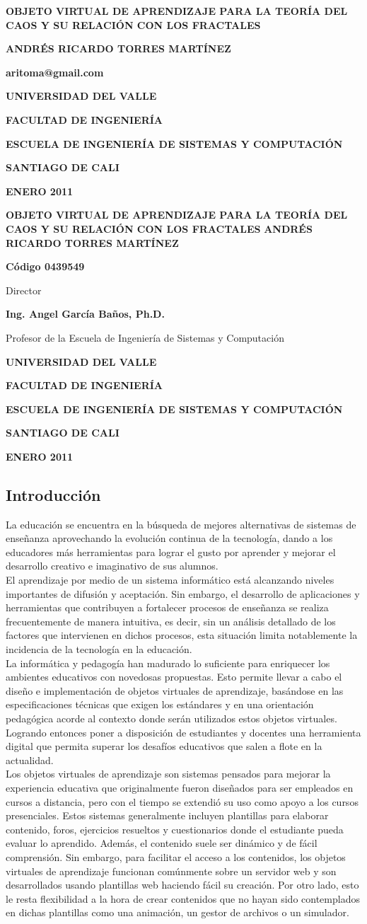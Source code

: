 \documentclass[letterpaper, 11pt, oneside]{article}
\makeatletter
\theoremstyle{definition}
\theoremstyle{remark}
\newcommand\portada{
\begin{titlepage}
		\begin{center}
			{\large \bf OBJETO VIRTUAL DE APRENDIZAJE PARA LA TEORÍA DEL CAOS Y SU RELACIÓN CON LOS FRACTALES}
			\vfill
			{\large\bf ANDRÉS RICARDO TORRES MARTÍNEZ\par}
			{\large\bf aritoma@gmail.com\par}
			\vfill
			{\large\bf UNIVERSIDAD DEL VALLE  \par}
			{\large\bf FACULTAD DE INGENIERÍA \par}
			{\large\bf ESCUELA DE INGENIERÍA DE SISTEMAS Y COMPUTACIÓN \par}
			{\large\bf SANTIAGO DE CALI \par}
			{\large\bf ENERO 2011 \par}
		\end{center}
\end{titlepage}
}
\newcommand\contraportada{
	\begin{titlepage}
		\begin{center}
			{\large \bf OBJETO VIRTUAL DE APRENDIZAJE PARA LA TEORÍA DEL CAOS Y SU RELACIÓN CON LOS FRACTALES } 
			\vfill
			{\large\bf ANDRÉS RICARDO TORRES MARTÍNEZ}
			\vfill
			{\large\bf Código 0439549 \par}
			
			\vfill
			{Director \par}
			{\bf Ing. Angel García Baños, Ph.D. \par}
			{Profesor de la Escuela de Ingeniería de Sistemas y Computación \par}
			\vfill
			{\large\bf UNIVERSIDAD DEL VALLE \par}
			{\large\bf FACULTAD DE INGENIERÍA \par}
			{\large\bf ESCUELA DE INGENIERÍA DE SISTEMAS Y COMPUTACIÓN \par}
			{\large\bf SANTIAGO DE CALI \par}
			{\large\bf ENERO 2011 \par}
		\end{center}
\end{titlepage}
}
\makeatother
\begin{document}
\portada
\contraportada

\renewcommand\contentsname{\centering Índice}
\tableofcontents
\clearpage

\renewcommand\listfigurename{\centering Índice de imagenes}
\listoffigures

\renewcommand\listtablename{\centering Índice de tablas} 
\listoftables
\clearpage



\begin{center}
 \section{Introducción}
\end{center}
La educación se encuentra en la búsqueda de mejores alternativas de sistemas de enseñanza aprovechando la evolución continua de la tecnología, dando a los educadores más herramientas para lograr el gusto por aprender y mejorar el desarrollo creativo e imaginativo de sus alumnos. \\

El aprendizaje por medio de un sistema informático está alcanzando niveles importantes de difusión y aceptación. Sin embargo, el desarrollo de aplicaciones y herramientas que contribuyen a fortalecer procesos de enseñanza  se realiza frecuentemente de manera intuitiva, es decir, sin un análisis detallado de los factores que intervienen en dichos procesos, esta situación limita notablemente la incidencia de la tecnología en la educación. \\

La informática y pedagogía han madurado lo suficiente para enriquecer los ambientes educativos con novedosas propuestas. Esto permite llevar a cabo el diseño e implementación de objetos virtuales de aprendizaje, basándose en las especificaciones técnicas que exigen los estándares y en una orientación pedagógica acorde al contexto donde serán utilizados estos objetos virtuales. Logrando entonces poner a disposición de estudiantes y docentes una herramienta digital que permita superar los desafíos educativos que salen a flote en la actualidad. \\

Los objetos virtuales de aprendizaje son sistemas pensados para mejorar la experiencia educativa que originalmente fueron diseñados para ser empleados en cursos a distancia, pero con el tiempo se extendió su uso como apoyo a los cursos presenciales. Estos sistemas generalmente incluyen plantillas para elaborar contenido, foros, ejercicios resueltos y cuestionarios donde el estudiante pueda evaluar lo aprendido. Además, el contenido suele ser dinámico y de fácil comprensión. Sin embargo, para facilitar el acceso a los contenidos, los objetos virtuales de aprendizaje funcionan comúnmente sobre un servidor web y son desarrollados usando plantillas web haciendo fácil su creación. Por otro lado, esto le resta flexibilidad a la hora de crear contenidos que no hayan sido contemplados en dichas plantillas como una animación, un gestor de archivos o un simulador. \\
\end{document}
